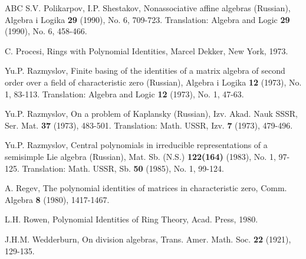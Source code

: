 \documentclass[10]{amsart}
\theoremstyle{definition}
\begin{document}
\begin{thebibliography}{ABC}
S.V. Polikarpov, I.P. Shestakov,
Nonassociative affine algebras (Russian),
Algebra i Logika {\bf 29} (1990), No. 6, 709-723.
Translation: Algebra and Logic {\bf 29} (1990), No. 6, 458-466.

C. Procesi, Rings with Polynomial Identities,
Marcel Dekker, New York, 1973.

Yu.P. Razmyslov,
Finite basing of the identities of a matrix algebra
of second order over a field of characteristic zero (Russian),
Algebra i Logika {\bf 12} (1973), No. 1, 83-113.
Translation: Algebra and Logic {\bf 12} (1973), No. 1, 47-63.

Yu.P. Razmyslov,
On a problem of Kaplansky (Russian),
Izv. Akad. Nauk SSSR, Ser. Mat. {\bf 37} (1973), 483-501.
Translation: Math. USSR, Izv. {\bf 7} (1973), 479-496.

Yu.P. Razmyslov,
Central polynomials in irreducible representations of a semisimple Lie algebra (Russian),
Mat. Sb. (N.S.) {\bf 122(164)} (1983), No. 1, 97-125.
Translation: Math. USSR, Sb. {\bf 50} (1985), No. 1, 99-124.

A. Regev,
The polynomial identities of matrices in characteristic zero,
Comm. Algebra {\bf 8} (1980), 1417-1467.

L.H. Rowen,
Polynomial Identities of Ring Theory,
Acad. Press, 1980.

J.H.M. Wedderburn, On division algebras,
Trans. Amer. Math. Soc. {\bf 22} (1921), 129-135.

\end{thebibliography}
\end{document}
